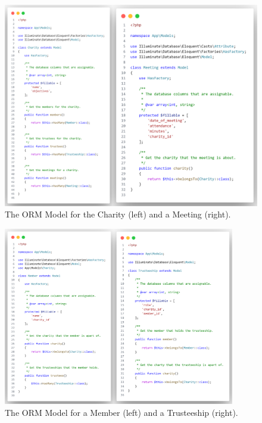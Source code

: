 \documentclass{UoYCSproject}
\begin{document}
\begin{figure}[H]
\begin{center}
\includegraphics[width=1\textwidth]{"./assets/apendix/model-code-screenshots/Charity and Meeting Combined.png"}
\end{center}
\caption{The ORM Model for the Charity (left) and a Meeting (right).}
\end{figure}

\begin{figure}[H]
\begin{center}
\includegraphics[width=0.9\textwidth]{"./assets/apendix/model-code-screenshots/Member and Trusteeship Combined.png"}
\end{center}
\caption{The ORM Model for a Member (left) and a Trusteeship (right).}
\end{figure}
\end{document}
